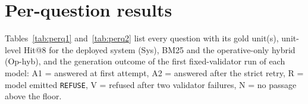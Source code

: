 \documentclass[conference]{IEEEtran}
\begin{document}
\section{Per-question results}
\label{app:perq}
Tables~\ref{tab:perq1} and~\ref{tab:perq2} list every question with its gold unit(s), unit-level Hit@8 for the deployed system (Sys), BM25 and the operative-only hybrid (Op-hyb), and the generation outcome of the first fixed-validator run of each model: A1 = answered at first attempt, A2 = answered after the strict retry, R = model emitted \texttt{REFUSE}, V = refused after two validator failures, N = no passage above the floor.

\begin{table}[p]
\centering
\caption{Per-question results (1/2).}
\label{tab:perq1}
\tiny
\setlength{\tabcolsep}{3pt}

\end{table}

\begin{table}[p]
\centering
\caption{Per-question results (2/2).}
\label{tab:perq2}
\tiny
\setlength{\tabcolsep}{3pt}

\end{table}
\end{document}
